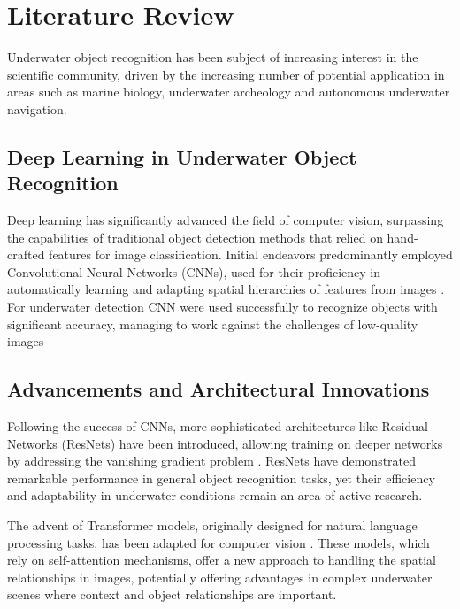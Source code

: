 
\section{Literature Review}
Underwater object recognition has been subject of increasing interest in the
scientific community,  driven by the increasing number of
potential application in areas such as marine biology, underwater archeology
and autonomous underwater navigation.

\subsection{Deep Learning in Underwater Object Recognition}
Deep learning has significantly advanced the field of computer vision,
surpassing the capabilities of traditional object detection methods that
relied on hand-crafted features for image classification.
Initial endeavors predominantly employed Convolutional Neural Networks
(CNNs), used for their proficiency in automatically learning
and adapting spatial hierarchies of features from
images \parencite{zhiqiangReviewObjectDetection2017}.
For underwater detection CNN were used successfully to recognize objects with
significant accuracy, managing to work against the challenges of low-quality
images \parencite{hanUnderwaterImageProcessing2020}

\subsection{Advancements and Architectural Innovations}
Following the success of CNNs, more sophisticated architectures
like Residual Networks (ResNets) have been introduced, allowing training on
deeper networks by addressing the vanishing gradient problem 
\parencite{heDeepResidualLearning2016}.
ResNets have demonstrated remarkable performance in general object recognition
tasks, yet their efficiency and adaptability in underwater conditions remain
an area of active research.

The advent of Transformer models, originally designed for natural
language processing tasks, has been adapted for computer
vision \parencite{hanSurveyVisionTransformer2023}.
These models, which rely on self-attention mechanisms, offer a new
approach to handling the spatial relationships in images,
potentially offering advantages in complex underwater scenes where context
and object relationships are important.

